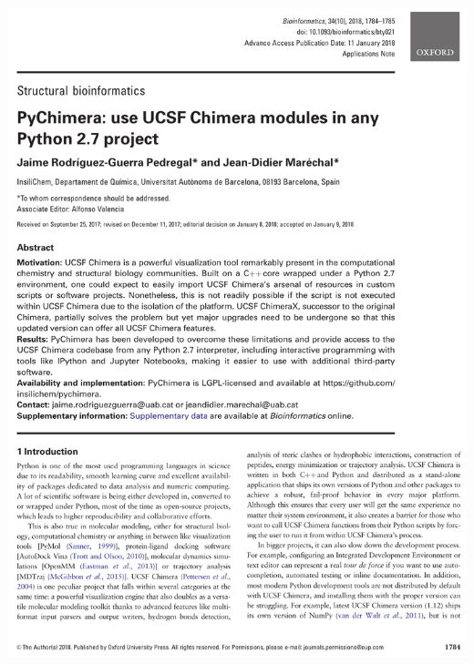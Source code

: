 \includegraphics[width=\textwidth]{figures/pubs/pychimera.pdf}
\clearpage\thispagestyle{empty}\mbox{}\clearpage
